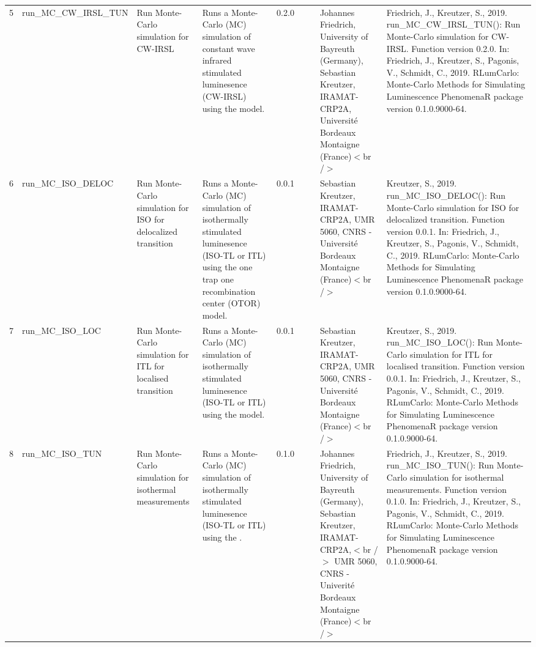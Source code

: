 \begin{table}[ht]
\begin{tabular}{rllllllll}
 \\ 
  5 & run\_MC\_CW\_IRSL\_TUN & Run Monte-Carlo simulation for CW-IRSL & Runs a Monte-Carlo (MC) simulation of constant wave infrared stimulated luminesence (CW-IRSL) using the model. & 0.2.0
 &  &  & Johannes Friedrich, University of Bayreuth (Germany), Sebastian Kreutzer, IRAMAT-CRP2A, Université Bordeaux Montaigne (France)$<$br /$>$ & Friedrich, J., Kreutzer, S., 2019. run\_MC\_CW\_IRSL\_TUN(): Run Monte-Carlo simulation for CW-IRSL. Function version 0.2.0. In: Friedrich, J., Kreutzer, S., Pagonis, V., Schmidt, C., 2019. RLumCarlo: Monte-Carlo Methods for Simulating Luminescence PhenomenaR package version 0.1.0.9000-64. 
 \\ 
  6 & run\_MC\_ISO\_DELOC & Run Monte-Carlo simulation for ISO for delocalized transition & Runs a Monte-Carlo (MC) simulation of isothermally stimulated luminesence (ISO-TL or ITL) using the one trap one recombination center (OTOR) model. & 0.0.1
 &  &  & Sebastian Kreutzer, IRAMAT-CRP2A, UMR 5060, CNRS - Université Bordeaux Montaigne (France)$<$br /$>$ & Kreutzer, S., 2019. run\_MC\_ISO\_DELOC(): Run Monte-Carlo simulation for ISO for delocalized transition. Function version 0.0.1. In: Friedrich, J., Kreutzer, S., Pagonis, V., Schmidt, C., 2019. RLumCarlo: Monte-Carlo Methods for Simulating Luminescence PhenomenaR package version 0.1.0.9000-64. 
 \\ 
  7 & run\_MC\_ISO\_LOC & Run Monte-Carlo simulation for ITL for localised transition & Runs a Monte-Carlo (MC) simulation of isothermally stimulated luminesence (ISO-TL or ITL) using the model. & 0.0.1
 &  &  & Sebastian Kreutzer, IRAMAT-CRP2A, UMR 5060, CNRS - Université Bordeaux Montaigne (France)$<$br /$>$ & Kreutzer, S., 2019. run\_MC\_ISO\_LOC(): Run Monte-Carlo simulation for ITL for localised transition. Function version 0.0.1. In: Friedrich, J., Kreutzer, S., Pagonis, V., Schmidt, C., 2019. RLumCarlo: Monte-Carlo Methods for Simulating Luminescence PhenomenaR package version 0.1.0.9000-64. 
 \\ 
  8 & run\_MC\_ISO\_TUN & Run Monte-Carlo simulation for isothermal measurements & Runs a Monte-Carlo (MC) simulation of isothermally stimulated luminesence (ISO-TL or ITL) using the . & 0.1.0
 &  &  & Johannes Friedrich, University of Bayreuth (Germany), Sebastian Kreutzer, IRAMAT-CRP2A,$<$br /$>$ UMR 5060, CNRS - Univerité Bordeaux Montaigne (France)$<$br /$>$ & Friedrich, J., Kreutzer, S., 2019. run\_MC\_ISO\_TUN(): Run Monte-Carlo simulation for isothermal measurements. Function version 0.1.0. In: Friedrich, J., Kreutzer, S., Pagonis, V., Schmidt, C., 2019. RLumCarlo: Monte-Carlo Methods for Simulating Luminescence PhenomenaR package version 0.1.0.9000-64. 

\end{tabular}
\end{table}
